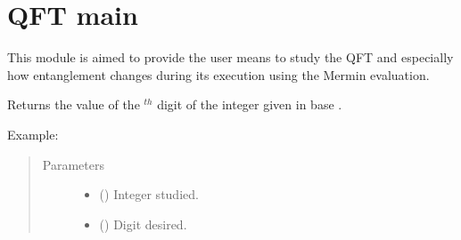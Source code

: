 \documentclass[letterpaper,10pt,english]{sphinxmanual}
\begin{document}
\section{QFT main}
\label{\detokenize{qft:module-qft}}\label{\detokenize{qft:qft-main}}\label{\detokenize{qft::doc}}
This module is aimed to provide the user means to study the QFT and especially 
how entanglement changes during its execution using the Mermin evaluation.

\begin{fulllineitems}
\label{\detokenize{qft:qft.bit_value}}
Returns the value of the  \(^{th}\) digit of the integer  given in 
base .
\begin{description}
\item[{Example:}] \leavevmode
{}%
\begin{sphinxVerbatim}[commandchars=\\\{\},formatcom=\footnotesize]
 
 
  
\end{sphinxVerbatim}

\end{description}
\begin{quote}\begin{description}
\item[{Parameters}] \leavevmode\begin{itemize}
\item {} 
 () \textendash{} Integer studied.

\item {} 
 () \textendash{} Digit desired.


\end{itemize}
\end{description}
\end{quote}
\end{fulllineitems}
\end{document}
